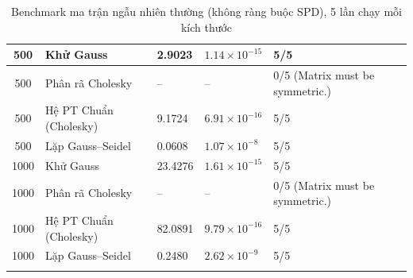 \documentclass[a4paper]{article}
\begin{document}
\begin{longtable}{|c|p{}|p{}|p{}|p{}|}
500 & Khử Gauss & 2.9023 & $1.14\times 10^{-15}$ & 5/5 \\ \hline
500 & Phân rã Cholesky & -- & -- & 0/5 (Matrix must be symmetric.) \\ \hline
500 & Hệ PT Chuẩn (Cholesky) & 9.1724 & $6.91\times 10^{-16}$ & 5/5 \\ \hline
500 & Lặp Gauss--Seidel & 0.0608 & $1.07\times 10^{-8}$ & 5/5 \\ \hline
1000 & Khử Gauss & 23.4276 & $1.61\times 10^{-15}$ & 5/5 \\ \hline
1000 & Phân rã Cholesky & -- & -- & 0/5 (Matrix must be symmetric.) \\ \hline
1000 & Hệ PT Chuẩn (Cholesky) & 82.0891 & $9.79\times 10^{-16}$ & 5/5 \\ \hline
1000 & Lặp Gauss--Seidel & 0.2480 & $2.62\times 10^{-9}$ & 5/5 \\ \hline
\caption{Benchmark ma trận ngẫu nhiên thường (không ràng buộc SPD), 5 lần chạy mỗi kích thước}
\label{tab:appendix_random_benchmark}
\end{longtable}
\endgroup
\end{document}
